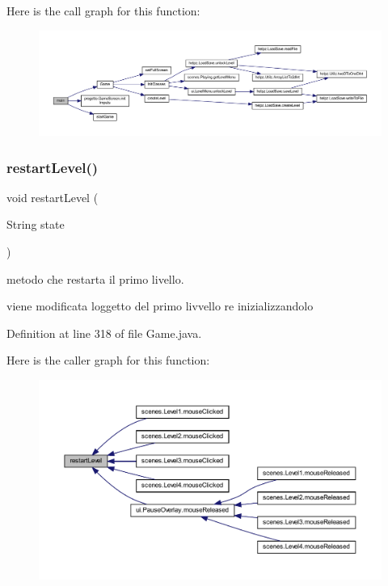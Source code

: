 Here is the call graph for this function\+:\nopagebreak
\begin{figure}[H]
\begin{center}
\leavevmode
\includegraphics[width=350pt]{classprogetto_1_1_game_a8b260eecbaabcef8473fd87ada040682_cgraph}
\end{center}
\end{figure}
\mbox{\label{classprogetto_1_1_game_a822df2119249080840a3149d454807d5}} 
\subsubsection{\texorpdfstring{restart\+Level()}{restartLevel()}}
{\footnotesize\ttfamily void restart\+Level (\begin{DoxyParamCaption}\item[{String}]{state }\end{DoxyParamCaption})}



metodo che restarta il primo livello. 

viene modificata l\textquotesingle{}oggetto del primo livvello re inizializzandolo 

Definition at line 318 of file Game.\+java.

Here is the caller graph for this function\+:\nopagebreak
\begin{figure}[H]
\begin{center}
\leavevmode
\includegraphics[width=350pt]{classprogetto_1_1_game_a822df2119249080840a3149d454807d5_icgraph}
\end{center}
\end{figure}
\mbox{\label{classprogetto_1_1_game_a13a43e6d814de94978c515cb084873b1}} 
